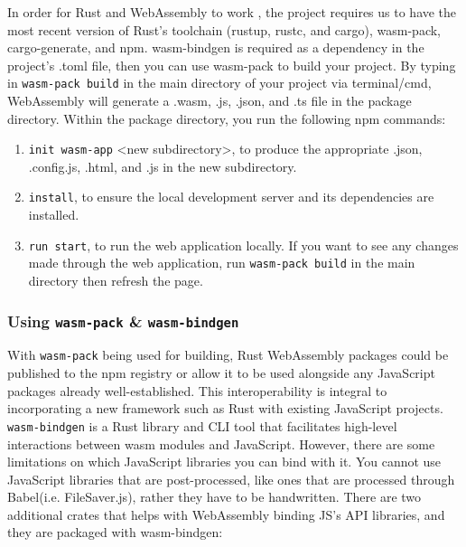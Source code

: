 \documentclass[
    paper=letter,
    parskip=half,
    fontsize=12pt,
    titlepage=firstiscover,
    toc=bibliography,
    numbers=endperiod
]{scrartcl}
\providecommand{\tightlist}{%
  \setlength{\itemsep}{0pt}\setlength{\parskip}{0pt}}
\begin{document}
In order for Rust and WebAssembly to work
\cite{wasm-game-of-life-introduction}, the project requires us to have
the most recent version of Rust's toolchain (rustup, rustc, and cargo),
wasm-pack, cargo-generate, and npm. wasm-bindgen is required as a
dependency in the project's .toml file, then you can use wasm-pack to
build your project. By typing in \texttt{wasm-pack build} in the main
directory of your project via terminal/cmd, WebAssembly will generate a
.wasm, .js, .json, and .ts file in the package directory. Within the
package directory, you run the following npm commands:

\begin{enumerate}
    \tightlist
    \item \texttt{init wasm-app} \textless new subdirectory\textgreater, to produce the
          appropriate .json, .config.js, .html, and .js in the new subdirectory.
    \item \texttt{install}, to ensure the local development server and its dependencies are
          installed.
    \item \texttt{run start}, to run the web application locally. If you want to see any
          changes made through the web application, run \texttt{wasm-pack build} in the
          main directory then refresh the page.
\end{enumerate}

\subsubsection{Using \texttt{wasm-pack} \& \texttt{wasm-bindgen}}
\label{subsec:pack-bindgen}

With \texttt{wasm-pack} \cite{wasm-pack} being used for building, Rust
WebAssembly packages could be published to the npm registry or allow it
to be used alongside any JavaScript packages already well-established.
This interoperability is integral to incorporating a new framework such
as Rust with existing JavaScript projects. \texttt{wasm-bindgen}
\cite{wasm-bindgen} is a Rust library and CLI tool that facilitates
high-level interactions between wasm modules and JavaScript. However,
there are some limitations on which JavaScript libraries you can bind
with it. You cannot use JavaScript libraries that are post-processed,
like ones that are processed through Babel(i.e. FileSaver.js), rather
they have to be handwritten. There are two additional crates that helps
with WebAssembly binding JS's API libraries, and they are packaged with
wasm-bindgen:
\end{document}
